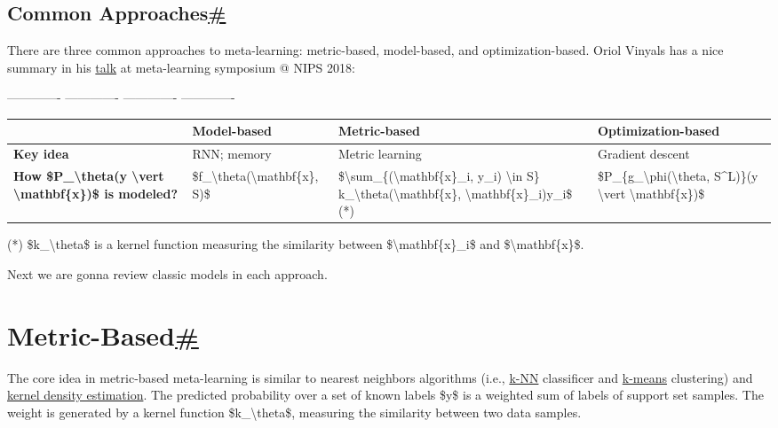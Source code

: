 \subsection{\texorpdfstring{Common Approaches\hyperref[common-approaches]{\#}}{Common Approaches\#}}\label{common-approaches}

There are three common approaches to meta-learning: metric-based, model-based, and optimization-based. Oriol Vinyals has a nice summary in his \href{http://metalearning-symposium.ml/files/vinyals.pdf}{talk} at meta-learning symposium @ NIPS 2018:

\textbar{} ------------- \textbar{} ------------- \textbar{} ------------- \textbar{} ------------- \textbar{}

\begin{longtable}[]{@{}llll@{}}
\toprule\noalign{}
& Model-based & Metric-based & Optimization-based \\
\midrule\noalign{}
\endhead
\bottomrule\noalign{}
\endlastfoot
\textbf{Key idea} & RNN; memory & Metric learning & Gradient descent \\
\textbf{How \$P\_\textbackslash theta(y \textbackslash vert \textbackslash mathbf\{x\})\$ is modeled?} & \$f\_\textbackslash theta(\textbackslash mathbf\{x\}, S)\$ & \$\textbackslash sum\_\{(\textbackslash mathbf\{x\}\_i, y\_i) \textbackslash in S\} k\_\textbackslash theta(\textbackslash mathbf\{x\}, \textbackslash mathbf\{x\}\_i)y\_i\$ (*) & \$P\_\{g\_\textbackslash phi(\textbackslash theta, S\^{}L)\}(y \textbackslash vert \textbackslash mathbf\{x\})\$ \\
\end{longtable}

(*) \$k\_\textbackslash theta\$ is a kernel function measuring the similarity between \$\textbackslash mathbf\{x\}\_i\$ and \$\textbackslash mathbf\{x\}\$.

Next we are gonna review classic models in each approach.

\section{\texorpdfstring{Metric-Based\hyperref[metric-based]{\#}}{Metric-Based\#}}\label{metric-based}

The core idea in metric-based meta-learning is similar to nearest neighbors algorithms (i.e., \href{https://en.wikipedia.org/wiki/K-nearest_neighbors_algorithm}{k-NN} classificer and \href{https://en.wikipedia.org/wiki/K-means_clustering}{k-means} clustering) and \href{https://en.wikipedia.org/wiki/Kernel_density_estimation}{kernel density estimation}. The predicted probability over a set of known labels \$y\$ is a weighted sum of labels of support set samples. The weight is generated by a kernel function \$k\_\textbackslash theta\$, measuring the similarity between two data samples.

